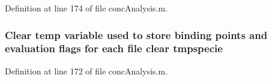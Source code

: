 Definition at line 174 of file conc\-Analysis.\-m.

\hypertarget{a00025_a045ecd9b02a87529b837dde223b08719}{
\subsubsection[{tmpspecie}]{\setlength{\rightskip}{0pt plus 5cm}Clear temp variable used {\bf to} store binding points {\bf and} evaluation flags for each {\bf file} clear tmpspecie}}\label{a00025_a045ecd9b02a87529b837dde223b08719}


Definition at line 172 of file conc\-Analysis.\-m.

